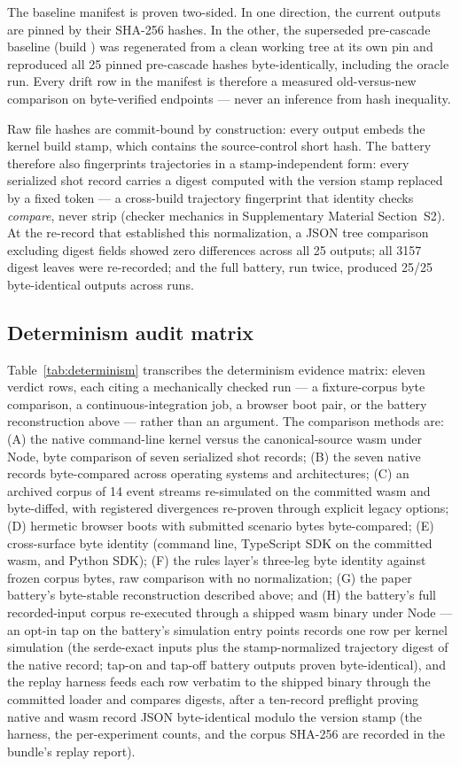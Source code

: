 The baseline manifest is proven two-sided. In one direction, the current
outputs are pinned by their SHA-256 hashes. In the other, the superseded
pre-cascade baseline (build ) was regenerated from a
clean working tree at its own pin and reproduced all 25 pinned
pre-cascade hashes byte-identically, including the oracle run. Every
drift row in the manifest is therefore a measured old-versus-new
comparison on byte-verified endpoints --- never an inference from hash
inequality.

Raw file hashes are commit-bound by construction: every output embeds the
kernel build stamp, which contains the source-control short hash. The
battery therefore also fingerprints trajectories in a stamp-independent
form: every serialized shot record carries a digest computed with the
version stamp replaced by a fixed token --- a cross-build trajectory
fingerprint that identity checks \emph{compare}, never strip (checker
mechanics in Supplementary Material Section~S2). At the re-record that
established this normalization, a JSON tree comparison excluding digest
fields showed zero differences across all 25 outputs; all 3157 digest
leaves were re-recorded; and the full battery, run twice, produced 25/25
byte-identical outputs across runs.

\subsection{Determinism audit matrix}

Table~\ref{tab:determinism} transcribes the determinism evidence matrix:
eleven verdict rows, each citing a mechanically checked run --- a
fixture-corpus byte comparison, a continuous-integration job, a browser
boot pair, or the battery reconstruction above --- rather than an
argument. The comparison methods are: (A) the native command-line kernel
versus the canonical-source wasm under Node, byte comparison of seven
serialized shot records; (B) the seven native records byte-compared
across operating systems and architectures; (C) an archived corpus of 14
event streams re-simulated on the committed wasm and byte-diffed, with
registered divergences re-proven through explicit legacy options; (D)
hermetic browser boots with submitted scenario bytes byte-compared; (E)
cross-surface byte identity (command line, TypeScript SDK on the
committed wasm, and Python SDK); (F) the rules layer's three-leg byte
identity against frozen corpus bytes, raw comparison with no
normalization; (G) the paper battery's byte-stable reconstruction
described above; and (H) the battery's full recorded-input corpus
re-executed through a shipped wasm binary under Node --- an opt-in tap
on the battery's simulation entry points records one row per kernel
simulation (the serde-exact inputs plus the stamp-normalized trajectory
digest of the native record; tap-on and tap-off battery outputs proven
byte-identical), and the replay harness feeds each row verbatim to the
shipped binary through the committed loader and compares digests, after
a ten-record preflight proving native and wasm record JSON
byte-identical modulo the version stamp (the harness, the
per-experiment counts, and the corpus SHA-256 are recorded in the
bundle's replay report).


